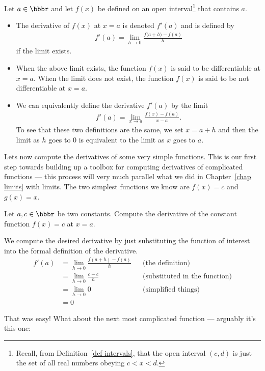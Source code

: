 \begin{defn}\label{def:DIFFderiv}
Let $a\in\bbbr$ and let $f(x)$ be defined on an open interval\footnote{
  Recall, from Definition~\ref{def intervals}, that the open interval $(c,d)$ is
  just the set of all real numbers obeying $c<x<d$.}
that contains $a$.
\begin{itemize}
 \item The derivative of $f(x)$ at $x=a$ is denoted
$f'(a)$ and is defined by
\begin{align*}
f'(a)=\lim_{h\rightarrow 0}\frac{f\big(a+h\big)-f(a)}{h}
\end{align*}
if the limit exists.
\item When the above limit exists, the function $f(x)$ is said
to be differentiable at $x=a$. When the limit does not  exist, the
function $f(x)$ is said to be not differentiable at $x=a$.

\item We can equivalently define the derivative $f'(a)$ by the limit
\begin{align*}
f'(a)=\lim_{x\rightarrow a}\frac{f(x)-f(a)}{x-a}.
\end{align*}
To see that these two definitions are the same, we set $x=a+h$ and then the limit as
$h$ goes to $0$ is equivalent to the limit as $x$ goes to $a$.
\end{itemize}
\end{defn}


Lets now compute the derivatives of some very simple functions. This is our first step
towards building up a toolbox for computing derivatives of complicated functions ---
this process will very much parallel what we did in Chapter~\ref{chap limits} with
limits. The two simplest functions we know are $f(x)=c$ and $g(x)=x$.
\begin{eg}[Derivative of $f(x)=c$]\label{eg:DIFFderivX0}
Let $a, c \in \bbbr$ be two constants. Compute the derivative of the constant function
$f(x) = c$ at $x=a$.

We compute the desired derivative by just substituting the function
of interest into the formal definition of the derivative.
\begin{align*}
  f'(a) &= \lim_{h \to 0} \frac{f(a+h) - f(a)}{h} && \text{(the definition)}\\
  &= \lim_{h \to 0} \frac{c - c}{h} && \text{(substituted in the function)} \\
  &= \lim_{h \to 0} 0 &&\text{(simplified things)}\\
  &= 0
\end{align*}
\end{eg}
That was easy! What about the next most complicated function ---
arguably it's this one:

